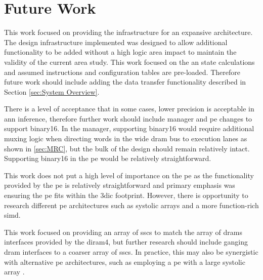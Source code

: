 \section[Future Work]{Future Work}
\label{sec:Future Work}

This work focused on providing the infrastructure for an expansive architecture.
The design infrastructure implemented was designed to allow additional functionality to be added without a high logic area impact to maintain the validity of the current area study.
This work focused on the \ac{an} state calculations and assumed instructions and configuration tables are pre-loaded.
Therefore future work should include adding the data transfer functionality described in Section \ref{sec:System Overview}.

There is a level of acceptance that in some cases, lower precision is acceptable in \ac{ann} inference, therefore further work should include manager and \ac{pe} changes to support \ac{binary16}.
In the manager, supporting \ac{binary16} would require additional muxing logic when directing words in the wide \ac{dram} bus to execution lanes as shown in \ref{sec:MRC}, but the bulk of the design should remain relatively intact.
Supporting \ac{binary16} in the \ac{pe} would be relatively straightforward.

This work does not put a high level of importance on the \ac{pe} as the functionality provided by the \ac{pe} is relatively straightforward and primary emphasis was ensuring the \ac{pe} fits within the \ac{3dic} footprint.
However, there is opportunity to research different \ac{pe} architectures such as systolic arrays and a more function-rich \ac{simd}.

This work focused on providing an array of \acp{ssc} to match the array of \acp{dram} interfaces provided by the \ac{diram4}, but further research should include ganging \ac{dram} interfaces to a coarser array of \acp{ssc}.
In practice, this may also be synergistic with alternative \ac{pe} architectures, such as employing a \ac{pe} with a large systolic array \cite{tensorflow2015-whitepaper}.

